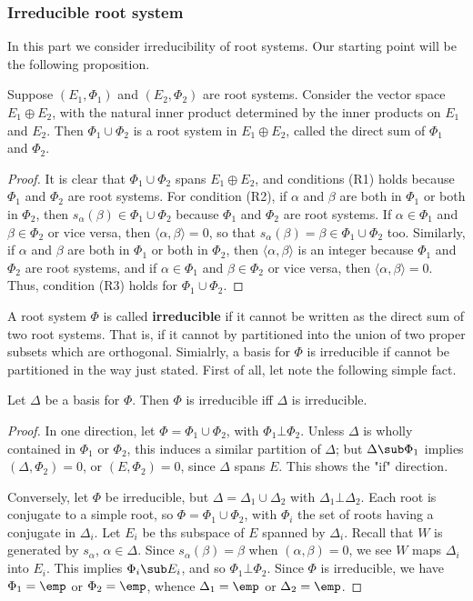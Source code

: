 \subsubsection{Irreducible root system}
In this part we consider irreducibility of root systems. Our starting point will be the following proposition.
\begin{proposition}\label{root system direct sum}
Suppose $(E_1,\Phi_1)$ and $(E_2,\Phi_2)$ are root systems. Consider the vector space $E_1\oplus E_2$, with the natural inner product determined by the inner products on $E_1$ and $E_2$. Then $\Phi_1\cup\Phi_2$ is a root system in $E_1\oplus E_2$, called the direct sum of $\Phi_1$ and $\Phi_2$.
\end{proposition}
\begin{proof}
It is clear that $\Phi_1\cup\Phi_2$ spans $E_1\oplus E_2$, and conditions (R1) holds because $\Phi_1$ and $\Phi_2$ are root systems. For condition (R2), if $\alpha$ and $\beta$ are both in $\Phi_1$ or both in $\Phi_2$, then $s_\alpha(\beta)\in\Phi_1\cup\Phi_2$ because $\Phi_1$ and $\Phi_2$ are root systems. If $\alpha\in\Phi_1$ and $\beta\in\Phi_2$ or vice versa, then $\langle\alpha,\beta\rangle=0$, so that $s_\alpha(\beta)=\beta\in\Phi_1\cup\Phi_2$ too. Similarly, if $\alpha$ and $\beta$ are both in $\Phi_1$ or both in $\Phi_2$, then $\langle\alpha,\beta\rangle$ is an integer because $\Phi_1$ and $\Phi_2$ are root systems, and if $\alpha\in\Phi_1$ and $\beta\in\Phi_2$ or vice versa, then $\langle\alpha,\beta\rangle=0$. Thus, condition (R3) holds for $\Phi_1\cup\Phi_2$.
\end{proof}
A root system $\Phi$ is called \textbf{irreducible} if it cannot be written as the direct sum of two root systems. That is, if it cannot by partitioned into the union of two proper subsets which are orthogonal. Simialrly, a basis for $\Phi$ is irreducible if cannot be partitioned in the way just stated. First of all, let note the following simple fact.
\begin{proposition}\label{root system irreducible iff basis is}
Let $\Delta$ be a basis for $\Phi$. Then $\Phi$ is irreducible iff $\Delta$ is irreducible.
\end{proposition}
\begin{proof}
In one direction, let $\Phi=\Phi_1\cup\Phi_2$, with $\Phi_1\bot\Phi_2$. Unless $\Delta$ is wholly contained in $\Phi_1$ or $\Phi_2$, this induces a similar partition of $\Delta$; but $\Delta\sub\Phi_1$ implies $(\Delta,\Phi_2)=0$, or $(E,\Phi_2)=0$, since $\Delta$ spans $E$. This shows the "if" direction.\par
Conversely, let $\Phi$ be irreducible, but $\Delta=\Delta_1\cup\Delta_2$ with $\Delta_1\bot\Delta_2$. Each root is conjugate to a simple root, so $\Phi=\Phi_1\cup\Phi_2$, with $\Phi_i$ the set of roots having a conjugate in $\Delta_i$. Let $E_i$ be ths subspace of $E$ spanned by $\Delta_i$. Recall that $W$ is generated by $s_\alpha$, $\alpha\in\Delta$. Since $s_\alpha(\beta)=\beta$ when $(\alpha,\beta)=0$, we see $W$ maps $\Delta_i$ into $E_i$. This implies $\Phi_i\sub E_i$, and so $\Phi_1\bot\Phi_2$. Since $\Phi$ is irreducible, we have $\Phi_1=\emp$ or $\Phi_2=\emp$, whence $\Delta_1=\emp$ or $\Delta_2=\emp$.
\end{proof}
